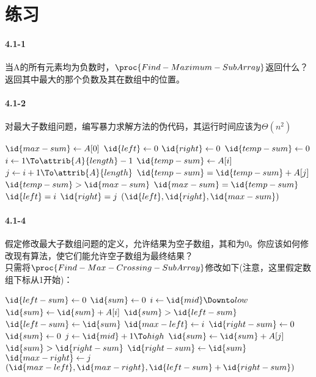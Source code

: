 \documentclass[a4paper,11pt]{article}
\begin{document}
\section*{练习}
\paragraph*{4.1-1}
当A的所有元素均为负数时，$\proc{Find-Maximum-SubArray}$返回什么？\\
返回其中最大的那个负数及其在数组中的位置。
\paragraph*{4.1-2}
对最大子数组问题，编写暴力求解方法的伪代码，其运行时间应该为$\Theta(n^2)$
\begin{codebox}
	\li $\id{max-sum} \gets A[0]$
	\li $\id{left} \gets 0$
	\li $\id{right} \gets 0$
	\li $\id{temp-sum} \gets 0$
	\li \For $i \gets 1 \To \attrib{A}{length}-1$
	\li		\Do $\id{temp-sum}\gets A[i]$
	\li		\For $j \gets i+1 \To \attrib{A}{length}$
	\li			\Do $\id{temp-sum} = \id{temp-sum} + A[j]$
	\li			\If $\id{temp-sum} > \id{max-sum}$
	\li				\Then $\id{max-sum}=\id{temp-sum}$
	\li				$\id{left} = i$
	\li				$\id{right} = j$
						\End
					\End
				\End
	\li \Return $(\id{left},\id{right},\id{max-sum})$
\end{codebox}
\paragraph*{4.1-4}
假定修改最大子数组问题的定义，允许结果为空子数组，其和为0。你应该如何修改现有算法，使它们能允许空子数组为最终结果？\\
只需将$\proc{Find-Max-Crossing-SubArray}$修改如下(注意，这里假定数组下标从1开始)：
\begin{codebox} 
  \li $\id{left-sum} \gets 0$
  \li $\id{sum} \gets 0$
  \li \For $i \gets \id{mid} \Downto low$
  \li   \Do
        $\id{sum} \gets \id{sum} + A[i]$ 
  \li   \If $\id{sum} > \id{left-sum}$
  \li       \Then 
            $\id{left-sum} \gets \id{sum}$
  \li       $\id{max-left} \gets i$
            \End
        \End
  \li $\id{right-sum} \gets 0$
  \li $\id{sum} \gets 0$
  \li \For $j \gets \id{mid} + 1 \To high$
  \li   \Do 
        $\id{sum} \gets \id{sum} + A[j]$
  \li   \If $\id{sum} > \id{right-sum}$
  \li     \Then
            $\id{right-sum} \gets \id{sum}$ 
  \li       $\id{max-right} \gets j$
          \End
        \End
  \li \Return $(\id{max-left},\id{max-right},\id{left-sum}+\id{right-sum})$
  \end{codebox}
\end{document}
